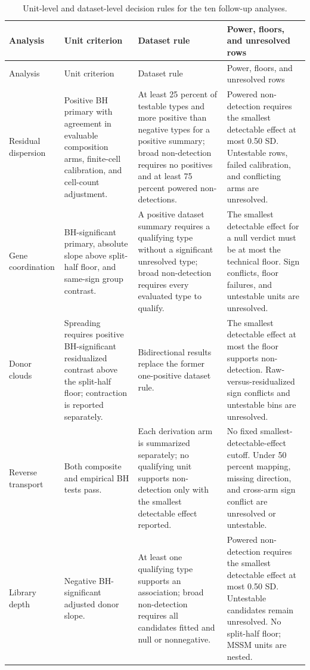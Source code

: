 \documentclass[11pt]{article}
\begin{document}
{\scriptsize\setlength{\tabcolsep}{2pt}\begin{longtable}{p{}p{}p{}p{}}
\caption{Unit-level and dataset-level decision rules for the ten follow-up analyses.}\label{tab:verdicts}\\
Analysis & Unit criterion & Dataset rule & Power, floors, and unresolved rows \\ \hline
\endfirsthead
Analysis & Unit criterion & Dataset rule & Power, floors, and unresolved rows \\ \hline
\endhead
Residual dispersion & Positive BH primary with agreement in evaluable composition arms, finite-cell calibration, and cell-count adjustment. & At least 25 percent of testable types and more positive than negative types for a positive summary; broad non-detection requires no positives and at least 75 percent powered non-detections. & Powered non-detection requires the smallest detectable effect at most 0.50 SD. Untestable rows, failed calibration, and conflicting arms are unresolved. \\ \hline
Gene coordination & BH-significant primary, absolute slope above split-half floor, and same-sign group contrast. & A positive dataset summary requires a qualifying type without a significant unresolved type; broad non-detection requires every evaluated type to qualify. & The smallest detectable effect for a null verdict must be at most the technical floor. Sign conflicts, floor failures, and untestable units are unresolved. \\ \hline
Donor clouds & Spreading requires positive BH-significant residualized contrast above the split-half floor; contraction is reported separately. & Bidirectional results replace the former one-positive dataset rule. & The smallest detectable effect at most the floor supports non-detection. Raw-versus-residualized sign conflicts and untestable bins are unresolved. \\ \hline
Reverse transport & Both composite and empirical BH tests pass. & Each derivation arm is summarized separately; no qualifying unit supports non-detection only with the smallest detectable effect reported. & No fixed smallest-detectable-effect cutoff. Under 50 percent mapping, missing direction, and cross-arm sign conflict are unresolved or untestable. \\ \hline
Library depth & Negative BH-significant adjusted donor slope. & At least one qualifying type supports an association; broad non-detection requires all candidates fitted and null or nonnegative. & Powered non-detection requires the smallest detectable effect at most 0.50 SD. Untestable candidates remain unresolved. No split-half floor; MSSM units are nested. \\ \hline

\end{longtable}}
\end{document}
